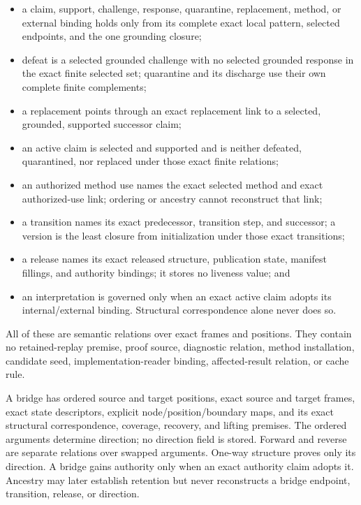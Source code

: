 \documentclass[11pt,twoside]{article}
\begin{document}
\begin{itemize}[leftmargin=2em]
  \item a claim, support, challenge, response, quarantine, replacement, method, or
        external binding holds only from its complete exact local pattern, selected
        endpoints, and the one grounding closure;
  \item defeat is a selected grounded challenge with no selected grounded response
        in the exact finite selected set; quarantine and its discharge use their
        own complete finite complements;
  \item a replacement points through an exact replacement link to a selected,
        grounded, supported successor claim;
  \item an active claim is selected and supported and is neither defeated,
        quarantined, nor replaced under those exact finite relations;
  \item an authorized method use names the exact selected method and exact
        authorized-use link; ordering or ancestry cannot reconstruct that link;
  \item a transition names its exact predecessor, transition step, and successor;
        a version is the least closure from initialization under those exact
        transitions;
  \item a release names its exact released structure, publication state, manifest
        fillings, and authority bindings; it stores no liveness value; and
  \item an interpretation is governed only when an exact active claim adopts its
        internal/external binding.  Structural correspondence alone never does so.
\end{itemize}

All of these are semantic relations over exact frames and positions.  They contain
no retained-replay premise, proof source, diagnostic relation, method installation,
candidate seed, implementation-reader binding, affected-result relation, or cache
rule.

A bridge has ordered source and target positions, exact source and target frames,
exact state descriptors, explicit node/position/boundary maps, and its exact
structural correspondence, coverage, recovery, and lifting premises.  The ordered
arguments determine direction; no direction field is stored.  Forward and reverse
are separate relations over swapped arguments.  One-way structure proves only its
direction.  A bridge gains authority only when an exact authority claim adopts it.
Ancestry may later establish retention but never reconstructs a bridge endpoint,
transition, release, or direction.
\end{document}
